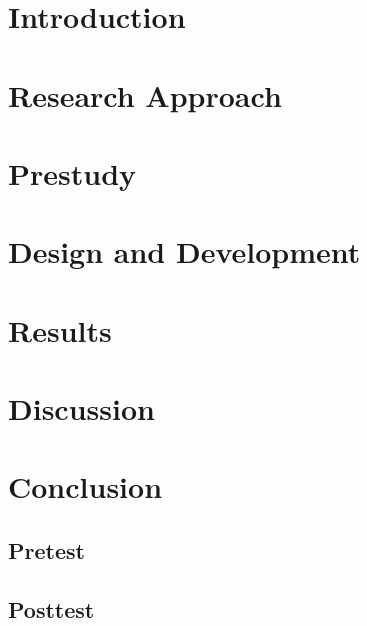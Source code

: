 \documentclass[12pt,a4paper]{book}
\newcommand{\blankpage}[0]{
	\newpage
	\thispagestyle{plain}
	\mbox{}
}
\begin{document}
\hypersetup{pageanchor=false}

\blankpage	
\cleardoublepage
\frontmatter



\tableofcontents
\listoftables
\listoffigures
\hypersetup{pageanchor=true}

\mainmatter
\part{Introduction}\label{part:introduction}


\part{Research Approach}\label{part:approach}


\part{Prestudy}\label{part:literature}


\part{Design and Development}\label{part:development}




\part{Results}\label{part:results}


\part{Discussion}\label{part:discussion}


\part{Conclusion}\label{part:conslusion}


\clearpage


\begin{appendices}
	\chapter{Pretest}\label{appendix:pretest}
		
	\chapter{Posttest}\label{appendix:posttest}
			
\end{appendices}
\end{document}
